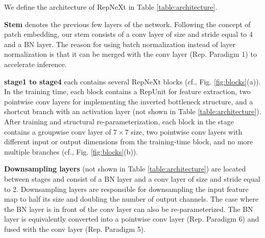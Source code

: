 \documentclass[preprint,12pt]{elsarticle}
\begin{document}
We define the architecture of RepNeXt in Table \ref{table:architecture}.

\textbf{Stem} denotes the previous few layers of the network. Following the concept of patch embedding, our stem consists of a conv layer of size and stride equal to 4 and a BN layer. The reason for using batch normalization instead of layer normalization is that it can be merged with the conv layer (Rep. Paradigm 1) to accelerate inference.

\textbf{stage1 to stage4} each contains several RepNeXt blocks (cf., Fig. \ref{fig:blocks}(a)). In the training time, each block contains a RepUnit for feature extraction, two pointwise conv layers for implementing the inverted bottleneck structure, and a shortcut branch with an activation layer (not shown in Table \ref{table:architecture}). After training and structural re-parameterization, each block in the stage contains a groupwise conv layer of $7 \times 7$ size, two pointwise conv layers with different input or output dimensions from the training-time block, and no more multiple branches (cf., Fig. \ref{fig:blocks}(b)).

\textbf{Downsampling layers} (not shown in Table \ref{table:architecture}) are located between stages and consist of a BN layer and a conv layer of size and stride equal to 2. Downsampling layers are responsible for downsampling the input feature map to half its size and doubling the number of output channels. The case where the BN layer is in front of the conv layer can also be re-parameterized. The BN layer is equivalently converted into a pointwise conv layer (Rep. Paradigm 6) and fused with the conv layer (Rep. Paradigm 5).
\end{document}
